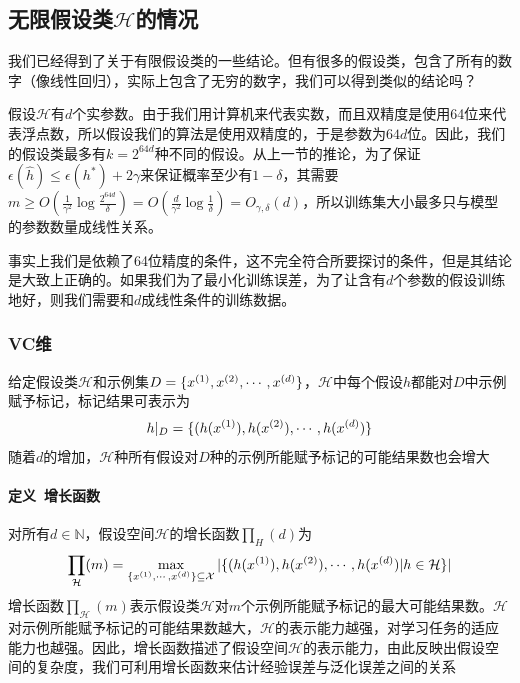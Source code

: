 \subsection{无限假设类$\mathcal{H}$的情况}
我们已经得到了关于有限假设类的一些结论。但有很多的假设类，包含了所有的数字（像线性回归），实际上包含了无穷的数字，我们可以得到类似的结论吗？

假设$\mathcal{H}$有$d$个实参数。由于我们用计算机来代表实数，而且双精度是使用64位来代表浮点数，所以假设我们的算法是使用双精度的，于是参数为$64d$位。因此，我们的假设类最多有$k=2^{64d}$种不同的假设。从上一节的推论，为了保证$\epsilon(\hat{h})\leq\epsilon(h^*)+2\gamma$来保证概率至少有$1-\delta$，其需要$m\geq O(\frac{1}{\gamma^2}\log\frac{2^{64d}}{\delta})=O(\frac{d}{\gamma^2}\log\frac{1}{\delta})=O_{\gamma,\delta}(d)$，所以训练集大小最多只与模型的参数数量成线性关系。

事实上我们是依赖了64位精度的条件，这不完全符合所要探讨的条件，但是其结论是大致上正确的。如果我们为了最小化训练误差，为了让含有$d$个参数的假设训练地好，则我们需要和$d$成线性条件的训练数据。

\subsubsection{VC维}
给定假设类$\mathcal{H}$和示例集$D=\{{x}^{({1})},{x}^{({2})},\cdots,{x}^{({d})}\}$，$\mathcal{H}$中每个假设$h$都能对$D$中示例赋予标记，标记结果可表示为
\begin{eqnarray}
h|_D=\{ (h({x}^{({1})}),h({x}^{({2})}),\cdots,h({x}^{({d})}) \}
\end{eqnarray}
随着$d$的增加，$\mathcal{H}$种所有假设对$D$种的示例所能赋予标记的可能结果数也会增大

\paragraph{定义\ 增长函数}对所有$d\in\mathbb{N}$，假设空间$\mathcal{H}$的增长函数$\prod_H(d)$为
\begin{eqnarray}
\prod_\mathcal{H}(m)=\max_{\{ {x}^{({1})},\cdots,{x}^{({d})} \}\subseteq\mathcal{X}}|\{ (h({x}^{({1})}),h({x}^{({2})}),\cdots,h({x}^{({d})})|h\in\mathcal{H} \}|
\end{eqnarray}
增长函数$\prod_\mathcal{H}(m)$表示假设类$\mathcal{H}$对$m$个示例所能赋予标记的最大可能结果数。$\mathcal{H}$对示例所能赋予标记的可能结果数越大，$\mathcal{H}$的表示能力越强，对学习任务的适应能力也越强。因此，增长函数描述了假设空间$\mathcal{H}$的表示能力，由此反映出假设空间的复杂度，我们可利用增长函数来估计经验误差与泛化误差之间的关系

